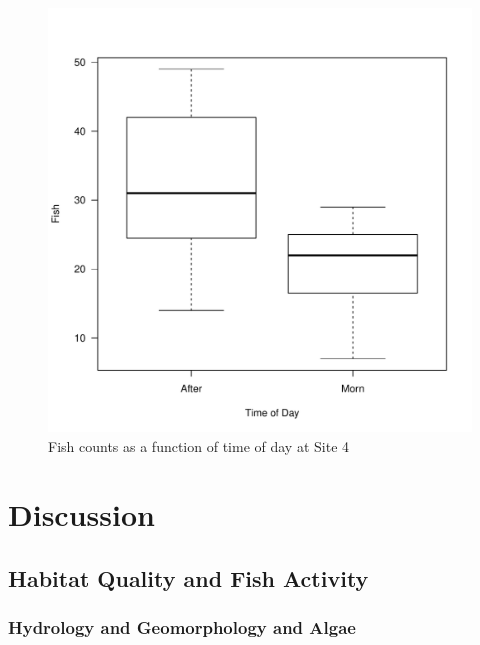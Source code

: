 \documentclass{article}\usepackage[]{graphicx}\usepackage[]{color}
\makeatletter
\def\maxwidth{ %
  \ifdim\Gin@nat@width>\linewidth
    \linewidth
  \else
    \Gin@nat@width
  \fi
}
\newenvironment{knitrout}{}{} %
\makeatother
\begin{document}
\begin{figure}[!ht]
\begin{knitrout}
\color{fgcolor}
\includegraphics[width=\maxwidth]{figure/unnamed-chunk-7-1} 

\end{knitrout}
\caption{Fish counts as a function of time of day at Site 4}
\label{fig:fishsection}
\end{figure}

\section{Discussion}

\subsection{Habitat Quality and Fish Activity}

\subsubsection{Hydrology and Geomorphology and Algae}
\end{document}
